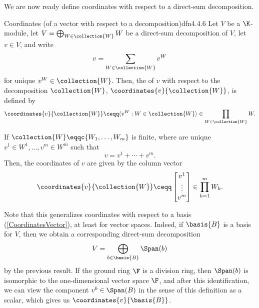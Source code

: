 We are now ready define coordinates with respect to a direct-sum decomposition.
\begin{dfn}{Coordinates (of a vector with respect to a decomposition)}{dfn4.4.6}
	Let $V$ be a $\K$-module, let $V=\bigoplus _{W\in \collection{W}}W$ be a direct-sum decomposition of $V$, let $v\in V$, and write
	\begin{equation}
	v=\sum _{W\in \collection{W}}v^W
	\end{equation}
	for unique $v^W\in \collection{W}$.  Then, the  of $v$ with respect to the decomposition $\collection{W}$, $\coordinates{v}{\collection{W}}$, is defined by
	\begin{equation}
	\coordinates{v}{\collection{W}}\ceqq \langle v^W:W\in \collection{W}\rangle \in \prod _{W\in \collection{W}}W.
	\end{equation}
	\begin{rmk}
		If $\collection{W}\eqqc \{ W_1,\ldots ,W_m\}$ is finite, where are unique $v^1\in W^1,\ldots ,v^m\in W^m$ such that
		\begin{equation}
		v=v^1+\cdots +v^m.
		\end{equation}
		Then, the coordinates of $v$ are given by the column vector
		\begin{equation}
		\coordinates{v}{\collection{W}}\ceqq \begin{bmatrix}v^1 \\ \vdots \\ v^m\end{bmatrix}\in \prod _{k=1}^mW_k.
		\end{equation}
	\end{rmk}
	\begin{rmk}
		Note that this generalizes coordinates with respect to a basis (\cref{CoordinatesVector}), at least for vector spaces.  Indeed, if $\basis{B}$ is a basis for $V$, then we obtain a corresponding direct-sum decomposition
		\begin{equation}
		V=\bigoplus _{b\in \basis{B}}\Span (b)
		\end{equation}
		by the previous result.  If the ground ring $\F$ is a division ring, then $\Span (b)$ is isomorphic to the one-dimensional vector space $\F$, and after this identification, we can view the component $v^b\in \Span (B)$ in the sense of this definition as a scalar, which gives us $\coordinates{v}{\basis{B}}$.
	\end{rmk}
\end{dfn}
